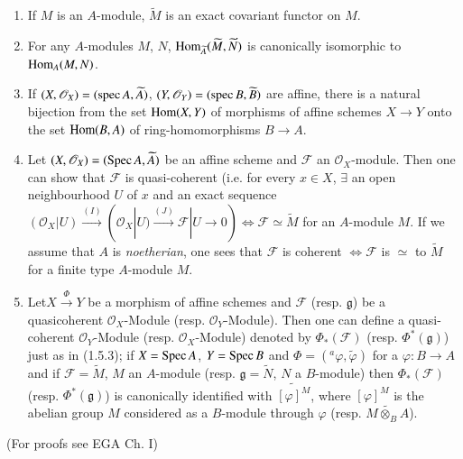 \setcounter{remarks}{3}
\begin{remarks}\label{chap1-rems1.6.4}
\begin{enumerate}
\renewcommand{\theenumi}{\alph{enumi}}
\renewcommand{\labelenumi}{\rm(\theenumi)}
\item If $M$ is an $A$-module, $\widetilde{M}$ is an exact covariant
  functor on $M$.

\item For any $A$-modules $M$, $N$,
  $\operatorname{Hom}_{\widetilde{A}}(\widetilde{M},\widetilde{N})$ is canonically
  isomorphic to $\operatorname{Hom}_{A}(M,N)$.

\item If $(X,\mathscr{O}_{X})=(\operatorname{spec} A,\widetilde{A})$,
  $(Y,\mathscr{O}_{Y})=(\operatorname{spec} B,\widetilde{B})$ are affine, there is a
  natural bijection from the set $\operatorname{Hom}(X,Y)$ of morphisms of affine
  schemes $X\to Y$ onto the set $\operatorname{Hom}(B,A)$ of ring-homomorphisms
  $B\to A$.

\item Let $(X,\mathscr{O}_{X})=(\operatorname{Spec} A,\widetilde{A})$ be an affine
  scheme and $\mathscr{F}$ an $\mathscr{O}_{X}$-module. Then one can
  show that $\mathscr{F}$ is quasi-coherent (i.e. for every $x\in X$,
  $\exists$ an open neighbourhood $U$ of $x$ and an exact sequence
  $(\mathscr{O}_{X}|U)\xrightarrow{(I)} (\mathscr{O}_{X}|U)\xrightarrow{(J)}
  \mathscr{F}|U\to 0)\Leftrightarrow \mathscr{F}\simeq \widetilde{M}$
  for an $A$-module $M$. If we assume that $A$ is {\em noetherian},
  one sees that $\mathscr{F}$ is coherent $\Leftrightarrow
  \mathscr{F}$ is $\simeq$ to $\widetilde{M}$ for a finite type
  $A$-module $M$.

\item Let\pageoriginale $X\xrightarrow{\Phi}Y$ be a morphism of affine
  schemes and $\mathscr{F}$ (resp. $\mathfrak{g}$) be a quasicoherent
  $\mathscr{O}_{X}$-Module (resp. $\mathscr{O}_{Y}$-Module). Then one
  can define a quasi-coherent $\mathscr{O}_{Y}$-Module
  (resp. $\mathscr{O}_{X}$-Module) denoted by
  $\Phi_{\ast}(\mathscr{F})$ (resp. $\Phi^{\ast}(\mathfrak{g})$) just
  as in (1.5.3); if $X=\operatorname{Spec} A$, $Y=\operatorname{Spec} B$ and
  $\Phi=({}^{a}\varphi,\widetilde{\varphi})$ for a $\varphi:B\to A$
  and if $\mathscr{F}=\widetilde{M}$, $M$ an $A$-module
  (resp. $\mathfrak{g}=\widetilde{N}$, $N$ a $B$-module) then
  $\Phi_{\ast}(\mathscr{F})$ (resp. $\Phi^{\ast}(\mathfrak{g})$) is
  canonically identified with $\widetilde{[\varphi]^{M}}$, where
  $[\varphi]^{M}$ is the abelian group $M$ considered as a $B$-module
  through $\varphi$ (resp. $\widetilde{M\otimes_{B}A}$).
\end{enumerate}
\end{remarks}

(For proofs see EGA Ch. I)


